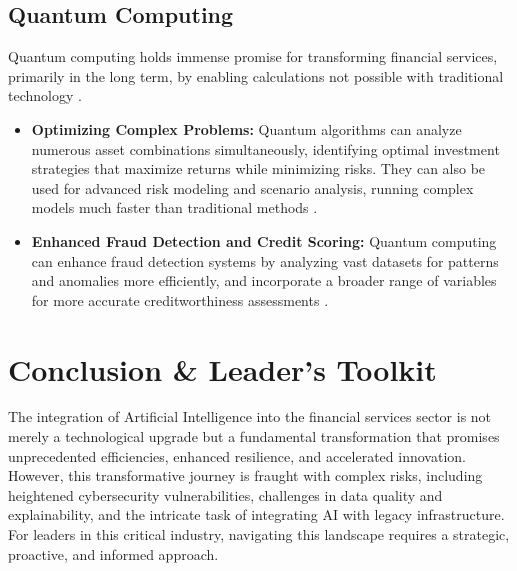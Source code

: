 \subsection{Quantum Computing}
Quantum computing holds immense promise for transforming financial services, primarily in the long term, by enabling calculations not possible with traditional technology \cite{AdriaBT_Quantum, IBM_Quantum}.
\begin{itemize}
    \item \textbf{Optimizing Complex Problems:} Quantum algorithms can analyze numerous asset combinations simultaneously, identifying optimal investment strategies that maximize returns while minimizing risks. They can also be used for advanced risk modeling and scenario analysis, running complex models much faster than traditional methods \cite{SpinQuanta_Quantum}.
    \item \textbf{Enhanced Fraud Detection and Credit Scoring:} Quantum computing can enhance fraud detection systems by analyzing vast datasets for patterns and anomalies more efficiently, and incorporate a broader range of variables for more accurate creditworthiness assessments \cite{AdriaBT_Quantum}.\end{itemize}

\section{Conclusion \& Leader's Toolkit}

The integration of Artificial Intelligence into the financial services sector is not merely a technological upgrade but a fundamental transformation that promises unprecedented efficiencies, enhanced resilience, and accelerated innovation. However, this transformative journey is fraught with complex risks, including heightened cybersecurity vulnerabilities, challenges in data quality and explainability, and the intricate task of integrating AI with legacy infrastructure. For leaders in this critical industry, navigating this landscape requires a strategic, proactive, and informed approach.

